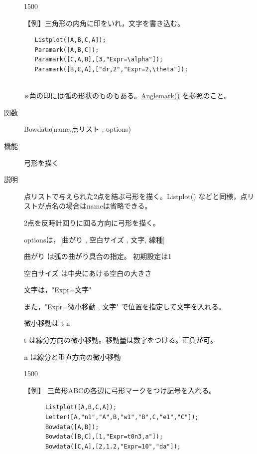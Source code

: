 \documentclass[papersize,a4paper,12pt,uplatex]{jsarticle}
\begin{document}
\begin{description}
\vspace{\baselineskip}
\begin{layer}{150}{0}
\end{layer}


【例】三角形の内角に印をいれ，文字を書き込む。

\begin{verbatim}
   Listplot([A,B,C,A]);
   Paramark([A,B,C]);
   Paramark([C,A,B],[3,"Expr=\alpha"]);
   Paramark([B,C,A],["dr,2","Expr=2,\theta"]);
   
\end{verbatim}

※角の印には弧の形状のものもある。\hyperlink{anglemark}{Anglemark()} を参照のこと。\\

\vspace{\baselineskip}
\hypertarget{bowdata}{}
\item[関数]  Bowdata(name,点リスト , options)
\item[機能]  弓形を描く
\item[説明]  点リストで与えられた2点を結ぶ弓形を描く。Listplot() などと同様，点リストが点名の場合はnameは省略できる。

2点を反時計回りに回る方向に弓形を描く。

optionsは，[曲がり , 空白サイズ  , 文字, 線種]

曲がり  は弧の曲がり具合の指定。 初期設定は1

空白サイズ  は中央にあける空白の大きさ

文字は，"Expr=文字" 

また，"Expr=微小移動 , 文字"  で位置を指定して文字を入れる。

微小移動は t  n 

 t は線分方向の微小移動。移動量は数字をつける。正負が可。

 n は線分と垂直方向の微小移動

\vspace{\baselineskip}
 \begin{layer}{150}{0}
 \end{layer}

【例】  三角形ABCの各辺に弓形マークをつけ記号を入れる。
\begin{verbatim}
      Listplot([A,B,C,A]);
      Letter([A,"n1","A",B,"w1","B",C,"e1","C"]);
      Bowdata([A,B]);
      Bowdata([B,C],[1,"Expr=t0n3,a"]);
      Bowdata([C,A],[2,1.2,"Expr=10","da"]);
\end{verbatim}


\end{description}
\end{document}
